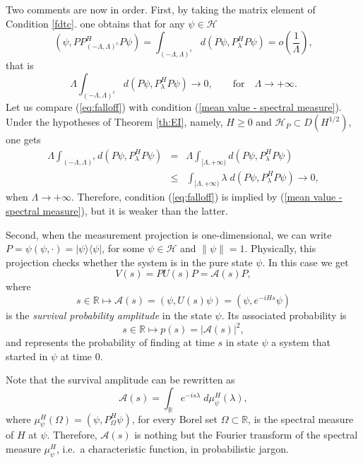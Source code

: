 \documentclass[aip,jmp
]{revtex4}
\newcommand{\RM}{\mathbb{R}}
\theoremstyle{definition}
\begin{document}
Two comments are now in order. First, by taking the matrix element of Condition \ref{fdtc}. one obtains that for any $\psi\in\mathcal{H}$
\[
(\psi, P
P_{(-\Lambda,\Lambda)^c}^H P\psi) 
= \int_{(-\Lambda,\Lambda)^c}  d (P\psi,P^H_\lambda P\psi) = o\left( \frac{1}{\Lambda} \right),
\]
that is
\begin{equation}
\label{eq:falloff}
\Lambda \int_{(-\Lambda,\Lambda)^c}  d (P\psi,P^H_\lambda P\psi)
\to 0, \qquad \text{for}\quad \Lambda\to +\infty.
\end{equation}
Let us compare (\ref{eq:falloff}) with condition (\ref{mean value - spectral measure}). Under the hypotheses of Theorem \ref{th:EI}, namely, $H\geq0$ and $\mathcal{H}_P\subset D(H^{1/2})$, one gets
\begin{eqnarray*}
\Lambda \int_{(-\Lambda,\Lambda)^c}  d (P\psi,P^H_\lambda P\psi) &=&
\Lambda \int_{[\Lambda,+\infty)}  d (P\psi,P^H_\lambda P\psi)
\\
&\leq&  \int_{[\Lambda,+\infty)} \lambda\; d (P\psi,P^H_\lambda P\psi) \to 0,
\end{eqnarray*}
when $\Lambda\to+\infty$. Therefore, condition (\ref{eq:falloff}) is implied by (\ref{mean value - spectral measure}), but it is weaker than the latter.



Second, when the measurement projection is
one-dimensional, we can write $P=\psi
(\psi,\cdot)=|\psi\rangle\langle\psi|$, for some
$\psi\in\mathcal{H}$ and $\|\psi\|=1$. Physically, this projection checks whether the system is in the pure state $\psi$. In this case we get
\begin{equation}
\label{eq:VsAs}
V(s)=P U(s) P=\mathcal{A}(s) P,
\end{equation}
where
\[
 s \in \RM \mapsto \mathcal{A}(s) = (\psi, U(s) \psi)= (\psi, e^{-i H s}\psi)
\]
is the \emph{survival probability amplitude} in the state $\psi$.
Its associated probability is
\[
 s \in \RM \mapsto p(s)=|\mathcal{A}(s)|^2,
\]
and represents the probability of finding  at time $s$ in state $\psi$ a system that started in $\psi$ at time $0$.

Note that the survival amplitude can be rewritten as
\[
\mathcal{A}(s) =
\int_{\RM} e^{-is\lambda}\; d\mu_{\psi}^H(\lambda),
\]
where $\mu_{\psi}^H(\Omega)=(\psi, P^H_{\Omega}\psi)$, for every Borel set $\Omega\subset\RM$, is the spectral measure of $H$ at $\psi$. Therefore, $\mathcal{A}(s)$ is nothing but the Fourier transform of the spectral measure $\mu_{\psi}^H$, i.e.\ a characteristic function, in probabilistic jargon.
\end{document}

